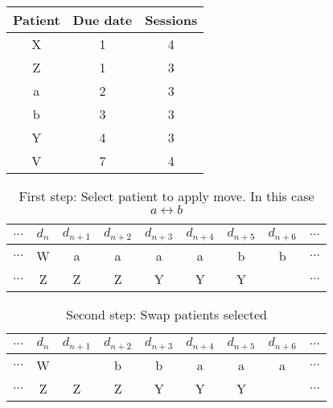 \begin{table}
\centering
\begin{tabular}{|c|c|c|}
	\hline
	Patient & Due date & Sessions\\
	\hline
	X & 1 & 4\\
	\hline
	Z & 1 & 3\\
	\hline
	a & 2 & 3\\
	\hline
	b & 3 & 3\\
	\hline
	Y & 4 & 3\\
	\hline
	V & 7 & 4\\
	\hline
\end{tabular}
\end{table}



\begin{table}
\centering
\begin{tabular}{|c|c|c|c|c|c|c|c|c|}
	\multicolumn{1}{c}{$...$} & \multicolumn{1}{c}{$d_n$} & \multicolumn{1}{c}{$d_{n+1}$} & \multicolumn{1}{c}{$d_{n+2}$} & \multicolumn{1}{c}{$d_{n+3}$} & \multicolumn{1}{c}{$d_{n+4}$} & \multicolumn{1}{c}{$d_{n+5}$} & \multicolumn{1}{c}{$d_{n+6}$} & \multicolumn{1}{c}{$...$}\\
	\hline
	$...$ & W & a & a & a & a & b & b & $...$\\
	\hline
	$...$ & Z & Z & Z & Y & Y & Y &   & $...$\\
	\hline
\end{tabular}
\caption{First step: Select patient to apply move. In this case $a\leftrightarrow b$}
\end{table}

\begin{table}
\centering
\begin{tabular}{|c|c|c|c|c|c|c|c|c|}
	\multicolumn{1}{c}{$...$} & \multicolumn{1}{c}{$d_n$} & \multicolumn{1}{c}{$d_{n+1}$} & \multicolumn{1}{c}{$d_{n+2}$} & \multicolumn{1}{c}{$d_{n+3}$} & \multicolumn{1}{c}{$d_{n+4}$} & \multicolumn{1}{c}{$d_{n+5}$} & \multicolumn{1}{c}{$d_{n+6}$} & \multicolumn{1}{c}{$...$}\\
	\hline
	$...$ & W &   & b & b & a & a & a & $...$\\
	\hline
	$...$ & Z & Z & Z & Y & Y & Y &   & $...$\\
	\hline
\end{tabular}
\caption{Second step: Swap patients selected}
\end{table}